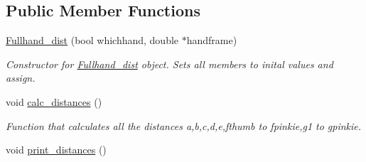 \subsection*{Public Member Functions}
\begin{DoxyCompactItemize}
\item 
\hyperlink{classFullhand__dist_afbe66c8ba417cd1ba911320242d75b1b}{Fullhand\_\-dist} (bool whichhand, double $\ast$handframe)
\begin{DoxyCompactList}\small\item\em Constructor for \hyperlink{classFullhand__dist}{Fullhand\_\-dist} object. Sets all members to inital values and assign. \end{DoxyCompactList}\item 
\hypertarget{classFullhand__dist_aad206f2788cd662dd3102c8cb18e1b41}{
void \hyperlink{classFullhand__dist_aad206f2788cd662dd3102c8cb18e1b41}{calc\_\-distances} ()}
\label{classFullhand__dist_aad206f2788cd662dd3102c8cb18e1b41}

\begin{DoxyCompactList}\small\item\em Function that calculates all the distances a,b,c,d,e,fthumb to fpinkie,g1 to gpinkie. \end{DoxyCompactList}\item 
\hypertarget{classFullhand__dist_a25cff12f92c49d4481e13c7c766d5e77}{
void \hyperlink{classFullhand__dist_a25cff12f92c49d4481e13c7c766d5e77}{print\_\-distances} ()}
\label{classFullhand__dist_a25cff12f92c49d4481e13c7c766d5e77}


\end{DoxyCompactItemize}
